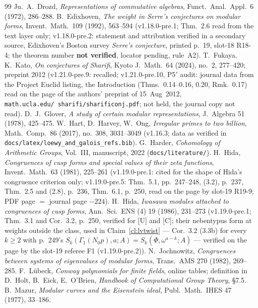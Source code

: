 \documentclass[11pt]{article}
\theoremstyle{remark}
\newcommand{\Ga}{\Gamma}
\begin{document}
\begin{thebibliography}{99}
 Ju.~A.~Drozd, \emph{Representations of commutative algebras}, Funct.\ Anal.\ Appl.\ 6 (1972), 286--288.
 B.~Edixhoven, \emph{The weight in Serre's conjectures on modular forms}, Invent.\ Math.\ 109 (1992), 563--594 (v1.18.0-pre.1; Thm.~2.6 read from the text layer only; v1.18.0-pre.2: statement and attribution verified in a secondary source, Edixhoven's Boston
survey \emph{Serre's conjecture}, printed p.~19, slot-18 R18-4; the theorem number \textbf{not verified}, locator pending, rule~A2).
 T.~Fukaya, K.~Kato, \emph{On conjectures of Sharifi}, Kyoto J.\ Math.\ 64 (2024), no.~2, 277--420; preprint 2012 (v1.21.0-pre.9: recalled; v1.21.0-pre.10, P5$'$ audit: journal data from the Project Euclid listing,
the Introduction (Thms.~0.14--0.16, 0.20, Rmk.~0.17) read on the page of the authors' preprint of 15~Aug~2012, \texttt{math.ucla.edu/\string~sharifi/sharificonj.pdf}; not held, the journal copy not read).
 D.~J.~Glover, \emph{A study of certain modular representations}, J.~Algebra 51 (1978), 425--475.
 W.~Hart, D.~Harvey, W.~Ong, \emph{Irregular primes to two billion}, Math.\ Comp.\ 86 (2017), no.~308, 3031--3049 (v1.16.3; data as verified in \texttt{docs/latex/loewy\_and\_galois\_refs.bib}).
 G.~Harder, \emph{Cohomology of Arithmetic Groups}, Vol.~III, manuscript, 2022 (\texttt{docs/literature/}).
 H.~Hida, \emph{Congruences of cusp forms and special values of their zeta functions}, Invent.\ Math.\ 63 (1981), 225--261 (v1.19.0-pre.1:
cited for the shape of Hida's congruence criterion only; v1.19.0-pre.5: Thm.~5.1, pp.~247--248, (3.2), p.~237, Thm.~2.5 and (2.8), p.~236, Thm.~6.1, p.~250, read on the page by
slot-19 R19-9; PDF page $=$ journal page $-224$).
 H.~Hida, \emph{Iwasawa modules attached to congruences of cusp forms}, Ann.\ Sci.\ ENS (4) 19 (1986), 231--273 (v1.19.0-pre.1; Thm.~3.1 and
Cor.~3.2, p.~250, verified for [U] and [C]; their nebentypus form at weights outside the class, used in Claim~\ref{cl:lvtwist} --- Cor.~3.2 (3.3b) for every $k\ge2$ with
p.~249's $S_k(\Ga_1(N_0p),a;A)=S_k(\Phi,\omega^{a-k};A)$ --- verified on the page by the slot-19 referee F1 (v1.19.0-pre.2)).
 N.~Jochnowitz, \emph{Congruences between systems of eigenvalues of modular forms}, Trans.\ AMS 270 (1982), 269--285.
 F.~L\"ubeck, \emph{Conway polynomials for finite fields}, online tables; definition in D.~Holt, B.~Eick, E.~O'Brien, \emph{Handbook of Computational Group Theory}, \S7.5.
 B.~Mazur, \emph{Modular curves and the Eisenstein ideal}, Publ.\ Math.\ IHES 47 (1977), 33--186.

\end{thebibliography}
\end{document}
